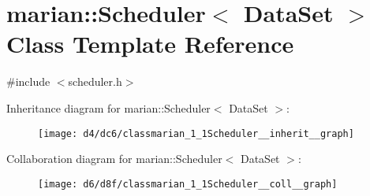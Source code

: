 \hypertarget{classmarian_1_1Scheduler}{}\section{marian\+:\+:Scheduler$<$ Data\+Set $>$ Class Template Reference}
\label{classmarian_1_1Scheduler}


{\ttfamily \#include $<$scheduler.\+h$>$}



Inheritance diagram for marian\+:\+:Scheduler$<$ Data\+Set $>$\+:
\nopagebreak
\begin{figure}[H]
\begin{center}
\leavevmode
\texttt{[image: d4/dc6/classmarian\_1\_1Scheduler\_\_inherit\_\_graph]}
\end{center}
\end{figure}


Collaboration diagram for marian\+:\+:Scheduler$<$ Data\+Set $>$\+:
\nopagebreak
\begin{figure}[H]
\begin{center}
\leavevmode
\texttt{[image: d6/d8f/classmarian\_1\_1Scheduler\_\_coll\_\_graph]}
\end{center}
\end{figure}

